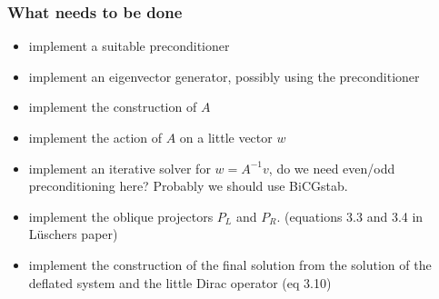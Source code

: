 \subsubsection*{What needs to be done}

\begin{itemize}
\item implement a suitable preconditioner
\item implement an eigenvector generator, possibly using the
  preconditioner 
\item implement the construction of $A$
\item implement the action of $A$ on a little vector $w$
\item implement an iterative solver for $w=A^{-1}v$, do we need
  even/odd preconditioning here? Probably we should use BiCGstab.
\item implement the oblique projectors $P_L$ and $P_R$. (equations 3.3
  and 3.4 in L{\"u}schers paper)
\item implement the construction of the final solution from the
  solution of the deflated system and the little Dirac operator (eq
  3.10) 
\end{itemize}

